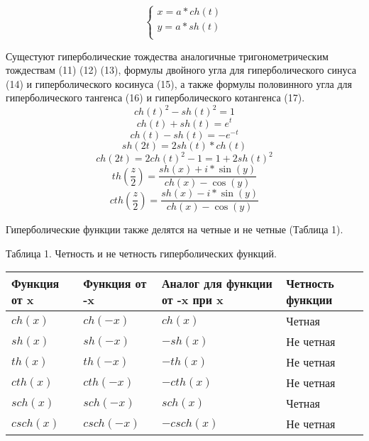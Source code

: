 \begin{equation}
    \begin{cases}
        x = a * ch(t)\\
        y = a * sh(t)\\
    \end{cases}
\end{equation}

Сущестуют гиперболические тождества аналогичные тригонометрическим тождествам (11) (12) (13), формулы двойного угла для гиперболического синуса (14) и гиперболического косинуса (15), а также формулы половинного угла для гиперболического тангенса (16) и гиперболического котангенса (17).
\begin{equation}
    ch(t)^2 - sh(t)^2 = 1
\end{equation}
\begin{equation}
    ch(t) + sh(t) = e^t
\end{equation}
\begin{equation}
    ch(t) - sh(t) = -e^{-t}
\end{equation}
\begin{equation}
    sh(2t) = 2sh(t)*ch(t)
\end{equation}
\begin{equation}
    ch(2t) = 2ch(t)^2 - 1 = 1 + 2sh(t)^2
\end{equation}
\begin{equation}
    th(\frac{z}{2})=\frac{sh(x)+i*\sin(y)}{ch(x)-\cos(y)}
\end{equation}
\begin{equation}
    cth(\frac{z}{2})=\frac{sh(x)-i*\sin(y)}{ch(x)-\cos(y)}
\end{equation}

Гиперболические функции также делятся на четные и не четные (Таблица 1).

Таблица 1. Четность и не четность гиперболических функций.
\begin{center}
\begin{tabular}{| p{3cm} | p{3cm} | p{3cm} | p{3cm} |}
    \hline
    Функция от x & Функция от -x & Аналог для функции от -x при x & Четность функции \\ \hline
    $ch(x)$ & $ch(-x)$ & $ch(x)$ & Четная  \\ \hline
    $sh(x)$ & $sh(-x)$ & $-sh(x)$ & Не четная \\\hline
    $th(x)$ & $th(-x)$ & $-th(x)$ &  Не четная  \\ \hline
    $cth(x)$ & $cth(-x)$ & $-cth(x)$ &  Не четная \\ \hline
    $sch(x)$ & $sch(-x)$ & $sch(x)$ & Четная \\ \hline
    $csch(x)$ & $csch(-x)$ & $-csch(x)$ &  Не четная \\ \hline
    \hline
\end{tabular}
\end{center}


